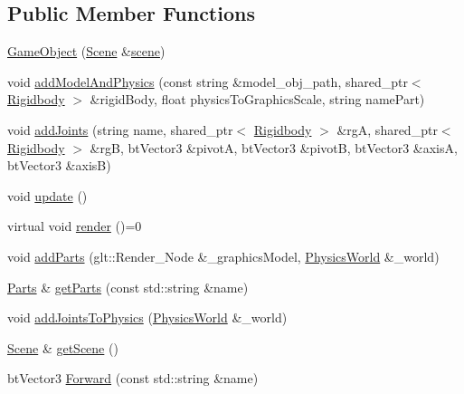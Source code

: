 \subsection*{Public Member Functions}
\begin{DoxyCompactItemize}
\item 
\mbox{\hyperlink{class_game_object_ab2c6683579548906dc8432bbd823fd76}{Game\+Object}} (\mbox{\hyperlink{class_scene}{Scene}} \&\mbox{\hyperlink{class_game_object_aeea61de934e13603696b4ed00e9fe42e}{scene}})
\item 
void \mbox{\hyperlink{class_game_object_a35111561ee0a5dcbd260ae282fbee715}{add\+Model\+And\+Physics}} (const string \&model\+\_\+obj\+\_\+path, shared\+\_\+ptr$<$ \mbox{\hyperlink{class_rigidbody}{Rigidbody}} $>$ \&rigid\+Body, float physics\+To\+Graphics\+Scale, string name\+Part)
\item 
void \mbox{\hyperlink{class_game_object_ac4d09cf168b9ad3e5ba0c31fb7872c76}{add\+Joints}} (string name, shared\+\_\+ptr$<$ \mbox{\hyperlink{class_rigidbody}{Rigidbody}} $>$ \&rgA, shared\+\_\+ptr$<$ \mbox{\hyperlink{class_rigidbody}{Rigidbody}} $>$ \&rgB, bt\+Vector3 \&pivotA, bt\+Vector3 \&pivotB, bt\+Vector3 \&axisA, bt\+Vector3 \&axisB)
\item 
void \mbox{\hyperlink{class_game_object_adad7d284b670db722a2fda8e6a7997e3}{update}} ()
\item 
virtual void \mbox{\hyperlink{class_game_object_adee58d508cfa907162d1192a25dc21b9}{render}} ()=0
\item 
void \mbox{\hyperlink{class_game_object_a514b9b67d7173aba4ed28ddc3e38fd5f}{add\+Parts}} (glt\+::\+Render\+\_\+\+Node \&\+\_\+graphics\+Model, \mbox{\hyperlink{class_physics_world}{Physics\+World}} \&\+\_\+world)
\item 
\mbox{\hyperlink{struct_game_object_1_1_parts}{Parts}} \& \mbox{\hyperlink{class_game_object_a918e94af30ef96eb8a602cf8b0453758}{get\+Parts}} (const std\+::string \&name)
\item 
void \mbox{\hyperlink{class_game_object_a18120b85704277a48ab064138b44e9eb}{add\+Joints\+To\+Physics}} (\mbox{\hyperlink{class_physics_world}{Physics\+World}} \&\+\_\+world)
\item 
\mbox{\hyperlink{class_scene}{Scene}} \& \mbox{\hyperlink{class_game_object_aed20b05219d7b5467dd1978d22fc3361}{get\+Scene}} ()
\item 
bt\+Vector3 \mbox{\hyperlink{class_game_object_a2f7657dbdbe8be16d9ed9c4a4c1c2ef1}{Forward}} (const std\+::string \&name)
\end{DoxyCompactItemize}
